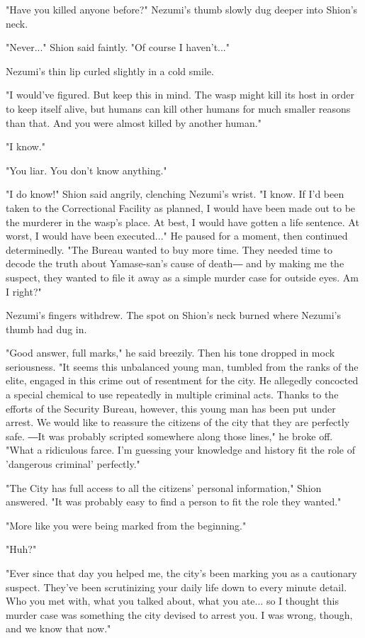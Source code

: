 "Have you killed anyone before?" Nezumi's thumb slowly dug deeper into
Shion's neck.

"Never..." Shion said faintly. "Of course I haven't..."

Nezumi's thin lip curled slightly in a cold smile.

"I would've figured. But keep this in mind. The wasp might kill its host
in order to keep itself alive, but humans can kill other humans for much
smaller reasons than that. And you were almost killed by another human."

"I know."

"You liar. You don't know anything."

"I do know!" Shion said angrily, clenching Nezumi's wrist. "I know. If
I'd been taken to the Correctional Facility as planned, I would have
been made out to be the murderer in the wasp's place. At best, I would
have gotten a life sentence. At worst, I would have been executed..." He
paused for a moment, then continued determinedly. "The Bureau wanted to
buy more time. They needed time to decode the truth about Yamase-san's
cause of death― and by making me the suspect, they wanted to file it
away as a simple murder case for outside eyes. Am I right?"

Nezumi's fingers withdrew. The spot on Shion's neck burned where
Nezumi's thumb had dug in.

"Good answer, full marks," he said breezily. Then his tone dropped in
mock seriousness. "It seems this unbalanced young man, tumbled from the
ranks of the elite, engaged in this crime out of resentment for the
city. He allegedly concocted a special chemical to use repeatedly in
multiple criminal acts. Thanks to the efforts of the Security Bureau,
however, this young man has been put under arrest. We would like to
reassure the citizens of the city that they are perfectly safe. ―It was
probably scripted somewhere along those lines," he broke off. "What a
ridiculous farce. I'm guessing your knowledge and history fit the role
of 'dangerous criminal' perfectly."

"The City has full access to all the citizens' personal information,"
Shion answered. "It was probably easy to find a person to fit the role
they wanted."

"More like you were being marked from the beginning."

"Huh?"

"Ever since that day you helped me, the city's been marking you as a
cautionary suspect. They've been scrutinizing your daily life down to
every minute detail. Who you met with, what you talked about, what you
ate... so I thought this murder case was something the city devised to
arrest you. I was wrong, though, and we know that now."

